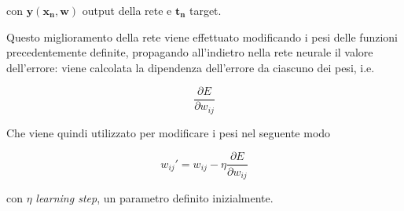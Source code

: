 con $\mathbf{y(x_n, w)}$ output della rete e $\mathbf{t_n}$ target.

Questo miglioramento della rete viene effettuato modificando i pesi delle funzioni 
precedentemente definite, propagando all'indietro nella rete neurale il valore dell'errore:
viene calcolata la dipendenza dell'errore da ciascuno dei pesi, i.e.

\begin{equation}
    \frac{\partial E}{\partial w_{ij}} 
    \label{eq:err_nn}
\end{equation}

Che viene quindi utilizzato per modificare i pesi nel seguente modo \cite{Mazur2015}

\begin{equation}
    w_{ij}' = w_{ij} - \eta  \frac{\partial E}{\partial w_{ij}}
    \label{eq:back_err}
\end{equation}

\noindent
con $\eta$ \textit{learning step}, un parametro definito inizialmente.
